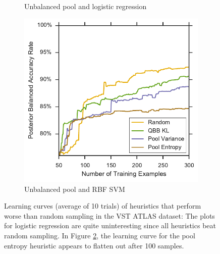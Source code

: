 \begin{figure}[p]
\begin{subfigure}{.5\textwidth}
		\caption{Unbalanced pool and logistic regression}
		\label{fig:vstatlas_ul_ind_lower}
	\end{subfigure}%
	\begin{subfigure}{.5\textwidth}
		\centering
		\includegraphics[width=\linewidth]{figures/5_active/vstatlas_ur_ind_lower}
		\caption{Unbalanced pool and RBF SVM}
		\label{fig:vstatlas_ur_ind_lower}
	\end{subfigure}
	\caption[Learning curves of heuristics worse than random (VST ATLAS)]{
		Learning curves (average of 10 trials) of heuristics that perform worse than random sampling in the VST ATLAS dataset: The plots for logistic regression are quite uninteresting
		since all heuristics beat random sampling. In Figure \ref{fig:vstatlas_ur_ind_lower},
		the learning curve for the pool entropy heuristic appears to flatten out after 100 samples.
		}
	\label{fig:vstatlas_ind_lower}
\end{figure}


